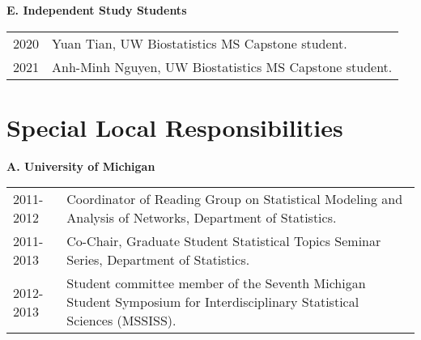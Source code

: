 \documentclass[10pt]{article}
\begin{document}
\textbf{E.  Independent Study Students}
\begin{table}[H]
\hskip0.9cm\begin{tabular}{p{1.6cm}p{12cm}}
2020 & Yuan Tian, UW Biostatistics MS Capstone student.\\
2021 & Anh-Minh Nguyen, UW Biostatistics MS Capstone student.
\end{tabular}
\end{table}


%
%
%

\section{Special Local Responsibilities}

\textbf{A. University of Michigan}

\begin{table}[H]
\hskip0.9cm\begin{tabular}{p{1.6cm}p{12cm}}
2011-2012 & Coordinator of Reading Group on Statistical Modeling and Analysis of Networks, Department of Statistics.\\
2011-2013 & Co-Chair, Graduate Student Statistical Topics Seminar Series, Department of Statistics.\\
2012-2013 & Student committee member of the Seventh Michigan Student Symposium for Interdisciplinary Statistical Sciences (MSSISS).
\end{tabular}
\end{table}
\end{document}
